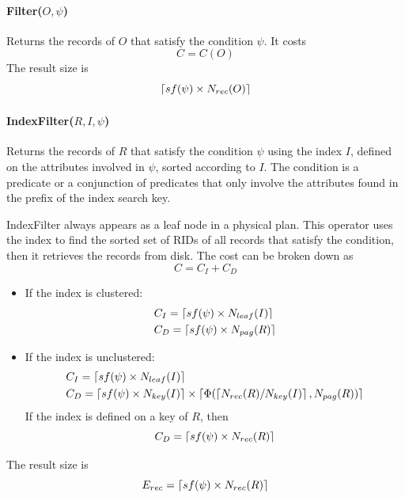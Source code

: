 \paragraph{Filter($O,\psi$)}
Returns the records of $O$ that satisfy the condition $\psi$. It costs
\begin{equation*}
    C = C(O)
\end{equation*}
The result size is
\begin{equation*}
    \left\lceil sf(\psi) \times N_{rec}(O)\right\rceil
\end{equation*}

\paragraph{IndexFilter($R,I,\psi$)}
Returns the records of $R$ that satisfy the condition $\psi$ using the index $I$, defined on the attributes involved in $\psi$, sorted according to $I$. The condition is a predicate or a conjunction of predicates that only involve the attributes found in the prefix of the index search key.

IndexFilter always appears as a leaf node in a physical plan. This operator uses the index to find the sorted set of RIDs of all records that satisfy the condition, then it retrieves the records from disk. The cost can be broken down as
\begin{equation*}
    C = C_I + C_D
\end{equation*}
\begin{itemize}
    \item If the index is clustered:
    \begin{align*}
        &C_I = \left\lceil sf(\psi) \times N_{leaf}(I)\right\rceil \\
        &C_D = \left\lceil sf(\psi) \times N_{pag}(R)\right\rceil
    \end{align*}

    \item If the index is unclustered:
    \begin{align*}
        &C_I = \left\lceil sf(\psi) \times N_{leaf}(I)\right\rceil \\
        &C_D = \left\lceil sf(\psi) \times N_{key}(I)\right\rceil \times \left\lceil\Phi(\left\lceil N_{rec}(R) / N_{key}(I)\right\rceil, N_{pag}(R))\right\rceil
    \end{align*}
    If the index is defined on a key of $R$, then
    \begin{equation*}
        C_D = \left\lceil sf(\psi) \times N_{rec}(R)\right\rceil
    \end{equation*}
\end{itemize}
The result size is
\begin{equation*}
    E_{rec} = \left\lceil sf(\psi) \times N_{rec}(R)\right\rceil
\end{equation*}


